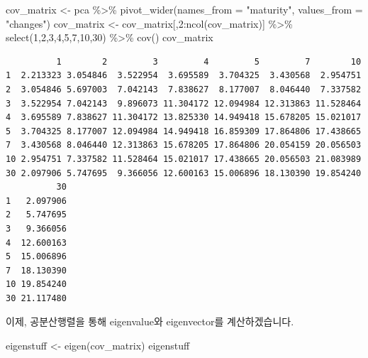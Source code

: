 \documentclass[
  a4paper,
  DIV=11,
  numbers=noendperiod]{scrreprt}
\newenvironment{Shaded}{\begin{snugshade}}{\end{snugshade}}
\newcommand{\AttributeTok}[1]{\textcolor[rgb]{0.40,0.45,0.13}{#1}}
\newcommand{\DecValTok}[1]{\textcolor[rgb]{0.68,0.00,0.00}{#1}}
\newcommand{\FunctionTok}[1]{\textcolor[rgb]{0.28,0.35,0.67}{#1}}
\newcommand{\NormalTok}[1]{\textcolor[rgb]{0.00,0.23,0.31}{#1}}
\newcommand{\OtherTok}[1]{\textcolor[rgb]{0.00,0.23,0.31}{#1}}
\newcommand{\SpecialCharTok}[1]{\textcolor[rgb]{0.37,0.37,0.37}{#1}}
\newcommand{\StringTok}[1]{\textcolor[rgb]{0.13,0.47,0.30}{#1}}
\begin{document}
\begin{Shaded}
\begin{Highlighting}[]
\NormalTok{cov\_matrix }\OtherTok{\textless{}{-}}\NormalTok{ pca }\SpecialCharTok{\%\textgreater{}\%} 
  \FunctionTok{pivot\_wider}\NormalTok{(}\AttributeTok{names\_from =} \StringTok{"maturity"}\NormalTok{, }\AttributeTok{values\_from =} \StringTok{"changes"}\NormalTok{)}
\NormalTok{cov\_matrix }\OtherTok{\textless{}{-}}\NormalTok{ cov\_matrix[,}\DecValTok{2}\SpecialCharTok{:}\FunctionTok{ncol}\NormalTok{(cov\_matrix)] }\SpecialCharTok{\%\textgreater{}\%} 
  \FunctionTok{select}\NormalTok{(}\StringTok{\textasciigrave{}}\AttributeTok{1}\StringTok{\textasciigrave{}}\NormalTok{,}\StringTok{\textasciigrave{}}\AttributeTok{2}\StringTok{\textasciigrave{}}\NormalTok{,}\StringTok{\textasciigrave{}}\AttributeTok{3}\StringTok{\textasciigrave{}}\NormalTok{,}\StringTok{\textasciigrave{}}\AttributeTok{4}\StringTok{\textasciigrave{}}\NormalTok{,}\StringTok{\textasciigrave{}}\AttributeTok{5}\StringTok{\textasciigrave{}}\NormalTok{,}\StringTok{\textasciigrave{}}\AttributeTok{7}\StringTok{\textasciigrave{}}\NormalTok{,}\StringTok{\textasciigrave{}}\AttributeTok{10}\StringTok{\textasciigrave{}}\NormalTok{,}\StringTok{\textasciigrave{}}\AttributeTok{30}\StringTok{\textasciigrave{}}\NormalTok{) }\SpecialCharTok{\%\textgreater{}\%} 
  \FunctionTok{cov}\NormalTok{()}
\NormalTok{cov\_matrix}
\end{Highlighting}
\end{Shaded}

\begin{verbatim}
          1        2         3         4         5         7        10
1  2.213323 3.054846  3.522954  3.695589  3.704325  3.430568  2.954751
2  3.054846 5.697003  7.042143  7.838627  8.177007  8.046440  7.337582
3  3.522954 7.042143  9.896073 11.304172 12.094984 12.313863 11.528464
4  3.695589 7.838627 11.304172 13.825330 14.949418 15.678205 15.021017
5  3.704325 8.177007 12.094984 14.949418 16.859309 17.864806 17.438665
7  3.430568 8.046440 12.313863 15.678205 17.864806 20.054159 20.056503
10 2.954751 7.337582 11.528464 15.021017 17.438665 20.056503 21.083989
30 2.097906 5.747695  9.366056 12.600163 15.006896 18.130390 19.854240
          30
1   2.097906
2   5.747695
3   9.366056
4  12.600163
5  15.006896
7  18.130390
10 19.854240
30 21.117480
\end{verbatim}

이제, 공분산행렬을 통해 eigenvalue와 eigenvector를 계산하겠습니다.

\begin{Shaded}
\begin{Highlighting}[]
\NormalTok{eigenstuff }\OtherTok{\textless{}{-}} \FunctionTok{eigen}\NormalTok{(cov\_matrix)}
\NormalTok{eigenstuff}
\end{Highlighting}
\end{Shaded}
\end{document}
